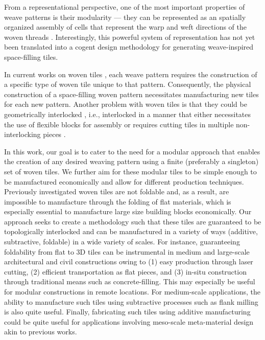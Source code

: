 \documentclass[times,twocolumn,final]{elsarticle}
\begin{document}
From a representational perspective, one of the most important properties of weave patterns is their modularity --- they can be represented as an spatially organized assembly of cells that represent the warp and weft directions of the woven threads \cite{Grunbaum80,Grunbaum85,Grunbaum86,grunbaum1988isonemal}. Interestingly, this powerful system of representation has not yet been translated into a cogent design methodology for generating weave-inspired space-filling tiles. 

In current works on woven tiles \cite{krishnamurthy2020bi,krishnamurthy2021geometrically}, each weave pattern requires the construction of a specific type of woven tile unique to that pattern. Consequently, the physical construction of a space-filling woven pattern necessitates manufacturing new tiles for each new pattern. Another problem with woven tiles is that they could be geometrically interlocked \cite{djumas2017deformation, estrin2021design}, i.e., interlocked in a manner that either necessitates the use of flexible blocks for assembly or requires cutting tiles in multiple non-interlocking pieces \cite{krishnamurthy2020bi,krishnamurthy2021geometrically}.

In this work, our goal is to cater to the need for a modular approach that enables the creation of any desired weaving pattern using a finite (preferably a singleton) set of woven tiles. We further aim for these modular tiles to be simple enough to be manufactured economically and allow for different production techniques. Previously investigated woven tiles \cite{krishnamurthy2021geometrically} are not foldable and, as a result, are impossible to manufacture through the folding of flat materials,   which is especially essential to manufacture large size building blocks economically.  Our approach seeks to create a methodology such that these tiles are guaranteed to be topologically interlocked \cite{djumas2017deformation} and can be manufactured in a variety of ways (additive, subtractive, foldable) in a wide variety of scales. For instance, guaranteeing foldability from flat to 3D tiles can be instrumental in medium and large-scale architectural and civil constructions owing to (1)  easy production through laser cutting, (2) efficient transportation as flat pieces, and (3) in-situ construction through traditional means such as concrete-filling. This may especially be useful for modular constructions in remote locations. For medium-scale applications, the ability to manufacture such tiles using subtractive processes such as flank milling is also quite useful. Finally, fabricating such tiles using additive manufacturing could be quite useful for applications involving meso-scale meta-material design akin to previous works.
\end{document}
